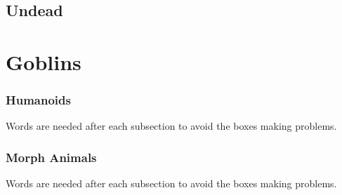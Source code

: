 \documentclass[a4paper,openany]{book}
\begin{document}
\begin{multicols}{2}

\fightAdvert

\bear

\boar

\chitincrawler

\basilisk

\wolf

\woodspy

\end{multicols}

\section{Undead}

\begin{multicols}{2}

\fightAdvert

\ghoul

\ghast

\demilich

\lich

\end{multicols}

\chapter{Goblins}

\begin{multicols}{2}

\subsection{Humanoids}
Words are needed after each subsection to avoid the boxes making problems.

\fightAdvert




\goblin

\goblin

\goblincaster

\hobgoblin

\ogre

\subsection{Morph Animals}
Words are needed after each subsection to avoid the boxes making problems.



\morphrat

\morphhorse

\morphcat

\morphslug

\morphspider

\morphwolf

\morphhuman

\end{multicols}
\end{document}
